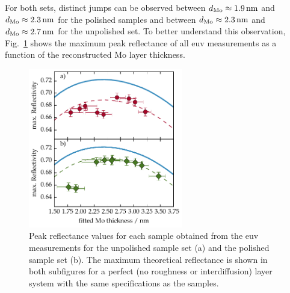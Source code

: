 For both sets, distinct jumps can be observed between $d_\text{Mo}\approx\nm{1.9}$ and $d_\text{Mo}\approx\nm{2.3}$ for the polished samples and between $d_\text{Mo}\approx\nm{2.3}$ and $d_\text{Mo}\approx\nm{2.7}$ for the unpolished set. To better understand this observation, Fig.~\ref{ch_spec:fig_EUV_peak_refl} shows the maximum peak reflectance of all \gls{euv} measurements as a function of the reconstructed Mo layer thickness.
\begin{figure}[htbp]
\centering
\includegraphics[width=0.6\textwidth]{img/MoSi_EUV_peak}
\caption{Peak reflectance values for each sample obtained from the \gls{euv} measurements for the unpolished sample set (a) and the polished sample set (b). The maximum theoretical reflectance is shown in both subfigures for a perfect (no roughness or interdiffusion) layer system with the same specifications as the samples.}
\label{ch_spec:fig_EUV_peak_refl}
\end{figure}

